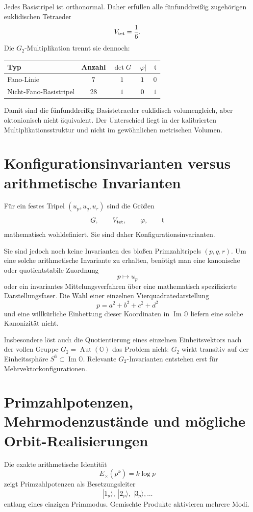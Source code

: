 \documentclass[11pt,a4paper]{article}
\theoremstyle{definition}
\theoremstyle{remark}
\newcommand{\OO}{\mathbb O}
\newcommand{\Aut}{\operatorname{Aut}}
\begin{document}
Jedes Basistripel ist orthonormal. Daher erfüllen alle fünfunddreißig zugehörigen euklidischen Tetraeder
\[
V_{\rm tet}=\frac16.
\]
Die $G_2$-Multiplikation trennt sie dennoch:
\begin{center}
\begin{tabular}{@{}lcccc@{}}
\toprule
Typ & Anzahl & $\det G$ & $|\varphi|$ & $\mathfrak t$ \\
\midrule
Fano-Linie & $7$ & $1$ & $1$ & $0$ \\
Nicht-Fano-Basistripel & $28$ & $1$ & $0$ & $1$ \\
\bottomrule
\end{tabular}
\end{center}
Damit sind die fünfunddreißig Basistetraeder euklidisch volumengleich, aber oktonionisch nicht äquivalent. Der Unterschied liegt in der kalibrierten Multiplikationsstruktur und nicht im gewöhnlichen metrischen Volumen.

\section{Konfigurationsinvarianten versus arithmetische Invarianten}
Für ein festes Tripel $(u_p,u_q,u_r)$ sind die Größen
\[
G,\qquad V_{\rm tet},\qquad\varphi,\qquad\mathfrak t
\]
mathematisch wohldefiniert. Sie sind daher Konfigurationsinvarianten.

Sie sind jedoch noch keine Invarianten des bloßen Primzahltripels $(p,q,r)$. Um eine solche arithmetische Invariante zu erhalten, benötigt man eine kanonische oder quotientstabile Zuordnung
\[
p\longmapsto u_p
\]
oder ein invariantes Mittelungsverfahren über eine mathematisch spezifizierte Darstellungsfaser. Die Wahl einer einzelnen Vierquadratedarstellung
\[
p=a^2+b^2+c^2+d^2
\]
und eine willkürliche Einbettung dieser Koordinaten in $\operatorname{Im}\OO$ liefern eine solche Kanonizität nicht.

Insbesondere löst auch die Quotientierung eines einzelnen Einheitsvektors nach der vollen Gruppe $G_2=\Aut(\OO)$ das Problem nicht: $G_2$ wirkt transitiv auf der Einheitssphäre $S^6\subset\operatorname{Im}\OO$. Relevante $G_2$-Invarianten entstehen erst für Mehrvektorkonfigurationen.

\section{Primzahlpotenzen, Mehrmodenzustände und mögliche Orbit-Realisierungen}
Die exakte arithmetische Identität
\[
E_\times(p^k)=k\log p
\]
zeigt Primzahlpotenzen als Besetzungsleiter
\[
|1_p\rangle,\ |2_p\rangle,\ |3_p\rangle,\dots
\]
entlang eines einzigen Primmodus. Gemischte Produkte aktivieren mehrere Modi.
\end{document}
